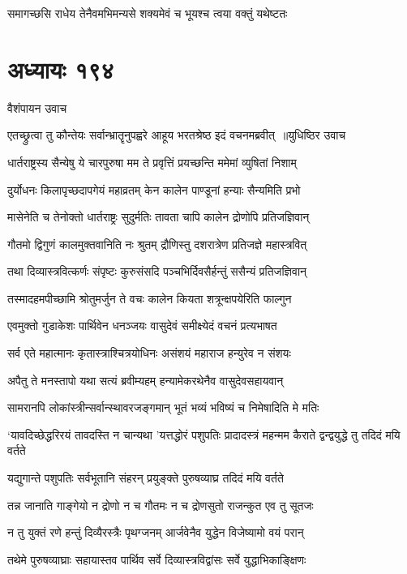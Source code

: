 \twolineshloka
{समागच्छसि राधेय तेनैवमभिमन्यसे}
{शक्यमेवं च भूयश्च त्वया वक्तुं यथेष्टतः}


\chapter{अध्यायः १९४}
\twolineshloka
{वैशंपायन उवाच}
{}


\threelineshloka
{एतच्छ्रुत्वा तु कौन्तेयः सर्वान्भ्रातॄनुपह्वरे}
{आहूय भरतश्रेष्ठ इदं वचनमब्रवीत् ॥युधिष्ठिर उवाच}
{}


\twolineshloka
{धार्तराष्ट्रस्य सैन्येषु ये चारपुरुषा मम}
{ते प्रवृत्तिं प्रयच्छन्ति ममेमां व्युषितां निशाम्}


\twolineshloka
{दुर्योधनः किलापृच्छदापगेयं महाव्रतम्}
{केन कालेन पाण्डूनां हन्याः सैन्यमिति प्रभो}


\twolineshloka
{मासेनेति च तेनोक्तो धार्तराष्ट्रः सुदुर्मतिः}
{तावता चापि कालेन द्रोणोपि प्रतिजज्ञिवान्}


\twolineshloka
{गौतमो द्विगुणं कालमुक्तवानिति नः श्रुतम्}
{द्रौणिस्तु दशरात्रेण प्रतिजज्ञे महास्त्रवित्}


\twolineshloka
{तथा दिव्यास्त्रवित्कर्णः संपृष्टः कुरुसंसदि}
{पञ्चभिर्दिवसैर्हन्तुं ससैन्यं प्रतिजज्ञिवान्}


\twolineshloka
{तस्मादहमपीच्छामि श्रोतुमर्जुन ते वचः}
{कालेन कियता शत्रून्क्षपयेरिति फाल्गुन}


\twolineshloka
{एवमुक्तो गुडाकेशः पार्थिवेन धनञ्जयः}
{वासुदेवं समीक्ष्येदं वचनं प्रत्यभाषत}


\twolineshloka
{सर्व एते महात्मानः कृतास्त्राश्चित्रयोधिनः}
{असंशयं महाराज हन्युरेव न संशयः}


\twolineshloka
{अपैतु ते मनस्तापो यथा सत्यं ब्रवीम्यहम्}
{हन्यामेकरथेनैव वासुदेवसहायवान्}


\twolineshloka
{सामरानपि लोकांस्त्रीन्सर्वान्स्थावरजङ्गमान्}
{भूतं भव्यं भविष्यं च निमेषादिति मे मतिः}


\threelineshloka
{`यावदिच्छेद्धरिरयं तावदस्ति न चान्यथा}
{'यत्तद्धोरं पशुपतिः प्रादादस्त्रं महन्मम}
{कैराते द्वन्द्वयुद्धे तु तदिदं मयि वर्तते}


\twolineshloka
{यद्युगान्ते पशुपतिः सर्वभूतानि संहरन्}
{प्रयुङ्क्ते पुरुषव्याघ्र तदिदं मयि वर्तते}


\twolineshloka
{तन्न जानाति गाङ्गेयो न द्रोणो न च गौतमः}
{न च द्रोणसुतो राजन्कुत एव तु सूतजः}


\twolineshloka
{न तु युक्तं रणे हन्तुं दिव्यैरस्त्रैः पृथग्जनम्}
{आर्जवेनैव युद्धेन विजेष्यामो वयं परान्}


\twolineshloka
{तथेमे पुरुषव्याघ्राः सहायास्तव पार्थिव}
{सर्वे दिव्यास्त्रविद्वांसः सर्वे युद्धाभिकाङ्क्षिणः}


